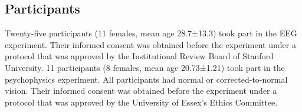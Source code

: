 \documentclass[9pt,twocolumn,twoside,lineno]{pnas-new}
\begin{document}




\subsection*{Participants}
Twenty-five participants (11 females, mean age 28.7±13.3) took part in the EEG experiment. Their informed consent was obtained before the experiment under a protocol that was approved by the Institutional Review Board of Stanford University. 11 participants (8 females, mean age 20.73±1.21) took part in the psychophysics experiment. All participants had normal or corrected-to-normal vision. Their informed consent was obtained before the experiment under a protocol that was approved by the University of Essex's Ethics Committee.
\end{document}
